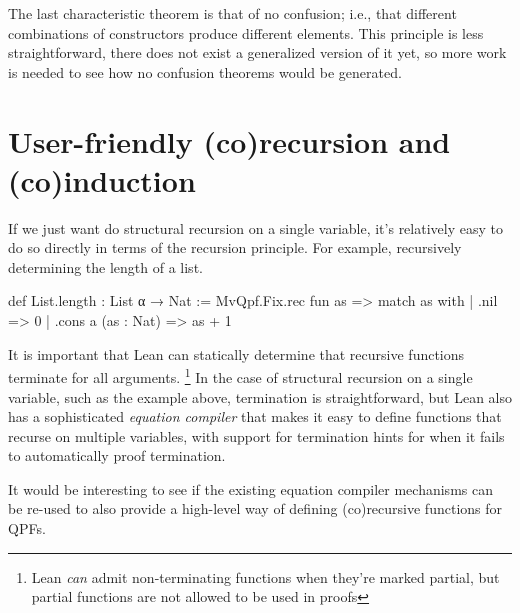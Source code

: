 The last characteristic theorem is that of no confusion; i.e., that different combinations of constructors
produce different elements. This principle is less straightforward, there does not exist a generalized
version of it yet, so more work is needed to see how no confusion theorems would be generated.



\section{User-friendly (co)recursion and (co)induction}
If we just want do structural recursion on a single variable, it's relatively easy to do so directly
in terms of the recursion principle.
For example, recursively determining the length of a list.
\begin{leancode}
def List.length : List α → Nat :=
  MvQpf.Fix.rec fun as => match as with
    | .nil                => 0
    | .cons a (as : Nat)  => as + 1 
\end{leancode}

It is important that Lean can statically determine that recursive functions terminate for all 
arguments. \footnote{Lean \emph{can} admit non-terminating functions when they're marked partial, but partial functions are not allowed to be used in proofs}
In the case of structural recursion on a single variable, such as the example above, termination is straightforward,
but Lean also has a sophisticated \emph{equation compiler} that makes it easy to define functions that recurse
on multiple variables, with support for termination hints for when it fails to automatically proof
termination.

It would be interesting to see if the existing equation compiler mechanisms can be re-used
to also provide a high-level way of defining (co)recursive functions for QPFs.






